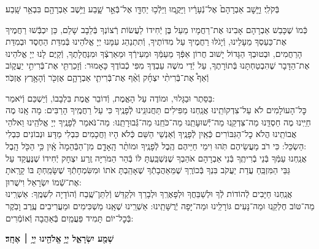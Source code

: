 \documentclass[twoside, openany, parskip=half, 11pt]{book}
\begin{document}
בְּֿקֹלִֽי׃ וַיָּ֤שׇׁב אַבְרָהָם֙ אֶל־נְֿעָרָ֔יו וַיָּקֻ֛מוּ וַיֵּלְֿכ֥וּ יַחְדָּ֖ו אֶל־בְּֿאֵ֣ר שָׁ֑בַע וַיֵּ֥שֶׁב אַבְרָהָ֖ם בִּבְאֵ֥ר שָֽׁבַע׃

כְּֿמוֹ שֶׁכָּבַשׁ אַבְרָהָם אָבִינוּ אֶת־רַחֲמָיו מֵעַל בֶּן יְֿחִידוֹ לַעֲשׂוֹת רְֿצוֹנְךָ בְּֿלֵבָב שָׁלֵם, כֵּן יִכְבְּֿֿשׁוּ רַחֲמֶיךָ אֶת־כַּעַסְךָ מֵעָלֵינוּ, וְֿיָגֹלּוּ רַחֲמֶיךָ עַל מִדּוֹתֶיךָ, וְֿתִתְנַהֵג עִמָּנוּ יְיָ אֱלֹהֵינוּ בְּֿמִדַּת הַחֶסֶד וּבְמִדַּת הָרַחֲמִים, וּבְטוּבְךָ הַגָּדוֹל יָשׁוּב חֲרוֹן אַפְּֿךָ מֵעַמְּֿךָ וּמֵעִירְֿךָ וּמֵאַרְצְֿךָ וּמִנַּחֲלָתֶךָ, וְֿקַיֶּם לָנוּ יְיָ אֱלֹהֵינוּ אֶת־הַדָּבָר שֶׁהִבְטַחְתָּנוּ בְּֿתוֹרָתֶךָ, עַל יְֿדֵי משֶׁה עַבְדֶּךָ מִפִּי כְֿבוֹדֶךָ כָּאָמוּר: וְֿזָכַרְתִּ֖י אֶת־בְּֿרִיתִ֣י יַעֲק֑וֹב וְֿאַף֩ אֶת־בְּֿרִיתִ֨י יִצְחָ֜ק וְֿאַ֨ף אֶת־בְּֿרִיתִ֧י אַבְרָהָ֛ם אֶזְכֹּ֖ר וְֿהָאָ֥רֶץ אֶזְכֹּֽר׃

בַּסֵּתֶר וּבַגָּלוּי, וּמוֹדֶה עַל הָאֱמֶת, וְֿדוֹבֵר אֱמֶת בִּלְבָבוֹ, וְֿיַשְׁכֵּם וְֿיֹאמַר: \\
כׇּל־הָעוֹלָמִים לֹא עַל־צִדְקוֹתֵֽינוּ אֲנַֽחְנוּ מַפִּילִים תַּחֲנוּנֵֽינוּ לְֿפָנֶֽיךָ כִּי עַל רַחֲמֶֽיךָ הָרַבִּים: מָה אָֽנוּ מֶה חַיֵּֽינוּ מֶה חַסְדֵּֽנוּ מַה־צִּדְקֵֽנוּ מַה־יְּֿֿשׁוּעָתֵֽנוּ מַה־כֹּחֵֽנוּ מַה־גְּֿֿבוּרָתֵֽנוּ: מַה־נֹּאמַר לְֿפָנֶֽיךָ יְיָ אֱלֹהֵֽינוּ וֵאלֹהֵי אֲבוֹתֵֽינוּ הֲלֹא כׇל־הַגִּבּוֹרִים כְּֿאַֽיִן לְֿפָנֶֽיךָ וְֿאַנְשֵׁי הַשֵּׁם כְּֿלֹא הָיוּ וַחֲכָמִים כִּבְלִי מַדָּע וּנְבוֹנִים כִּבְלִי הַשְׂכֵּל: כִּי רֹב מַעֲשֵׂיהֶם תֹּֽהוּ וִימֵי חַיֵּיהֶם הֶֽבֶל לְֿפָנֶֽיךָ וּמוֹתַ֨ר הָֽאָדָ֤ם מִן־הַבְּֿהֵמָה֙ אָֽ֔יִן כִּ֥י הַכֹּ֖ל הָֽבֶל: \\
אֲנַֽחְנוּ עַמְּֿךָ בְּֿנֵי בְֿרִיתֶֽךָ בְּֿנֵי אַבְרָהָם אֹהַבְךָ שֶׁנִּשְׁבַּֽעְתָּ לּוֹ בְּֿהַר הַמֹּרִיָּה זֶֽרַע יִצְחָק יְֿחִידוֹ שֶׁנֶּעֱקַד עַל גַּבֵּי הַמִּזְבֵּֽחַ עֲדַת יַעֲקֹב בִּנְךָ בְּֿכוֹרֶֽךָ שֶׁמֵּאַהֲבָתְֿךָ שֶׁאָהַֽבְתָּ אֹתוֹ וּמִשִּׂמְחָתְֿךָ שֶׁשָּׂמַֽחְתָּ בּוֹ קָרָֽאתָ אֶת־שְֿׁמוֹ יִשְׂרָאֵל וִישֻׁרוּן: \\
אֲנַֽחְנוּ חַיָּבִים לְֿהוֹדוֹת לְֿךָ וּלְשַׁבֵּחֲךָ וּלְפָאֶרְֽךָ וּלְבָרֵךְ וּלְקַדֵּשׁ וְֿלִתֵּן־שֶֽׁבַח וְֿהוֹדָיָה לִשְׁמֶֽךָ: אַשְׁרֵֽינוּ מַה־טּוֹב חֶלְקֵֽנוּ וּמַה־נָּעִים גּוֹרָלֵֽינוּ וּמַה־יָּפָה יְֿרֻשָּׁתֵֽינוּ: אַשְׁרֵֽינוּ שֶׁאָֽנוּ מַשְׁכִּימִים וּמַעֲרִיבִים עֶֽרֶב וָבֹֽקֶר בְּֿכׇל־יוֹם תָּמִיד פַּעֲמַֽיִם בְּֿאַהֲבָה וְֿאוֹמְֿרִים:

\begin{Large}
\textbf{שְׁמַ֖ע יִשְׂרָאֵ֑ל יְיָ֥ אֱלֹהֵ֖ינוּ יְיָ֥ ׀ אֶחָֽד׃}
\end{Large}
\end{document}
